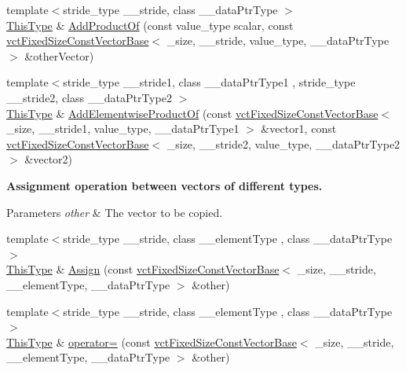 \begin{DoxyCompactItemize}
\item 
{\footnotesize template$<$stride\+\_\+type \+\_\+\+\_\+stride, class \+\_\+\+\_\+data\+Ptr\+Type $>$ }\\\hyperlink{classvct_fixed_size_const_vector_base_a071063bc4fa43112cc287b2dbef53180}{This\+Type} \& \hyperlink{classvct_fixed_size_vector_base_a850445a0bda31f286347257e54b721a3}{Add\+Product\+Of} (const value\+\_\+type scalar, const \hyperlink{classvct_fixed_size_const_vector_base}{vct\+Fixed\+Size\+Const\+Vector\+Base}$<$ \+\_\+size, \+\_\+\+\_\+stride, value\+\_\+type, \+\_\+\+\_\+data\+Ptr\+Type $>$ \&other\+Vector)
\item 
{\footnotesize template$<$stride\+\_\+type \+\_\+\+\_\+stride1, class \+\_\+\+\_\+data\+Ptr\+Type1 , stride\+\_\+type \+\_\+\+\_\+stride2, class \+\_\+\+\_\+data\+Ptr\+Type2 $>$ }\\\hyperlink{classvct_fixed_size_const_vector_base_a071063bc4fa43112cc287b2dbef53180}{This\+Type} \& \hyperlink{classvct_fixed_size_vector_base_a3bf0e468dd8a468889edd1c13a3d3f15}{Add\+Elementwise\+Product\+Of} (const \hyperlink{classvct_fixed_size_const_vector_base}{vct\+Fixed\+Size\+Const\+Vector\+Base}$<$ \+\_\+size, \+\_\+\+\_\+stride1, value\+\_\+type, \+\_\+\+\_\+data\+Ptr\+Type1 $>$ \&vector1, const \hyperlink{classvct_fixed_size_const_vector_base}{vct\+Fixed\+Size\+Const\+Vector\+Base}$<$ \+\_\+size, \+\_\+\+\_\+stride2, value\+\_\+type, \+\_\+\+\_\+data\+Ptr\+Type2 $>$ \&vector2)
\end{DoxyCompactItemize}
\begin{Indent}{\bf Assignment operation between vectors of different types.}\par
{\em 
\begin{DoxyParams}{Parameters}
{\em other} & The vector to be copied. \\
\hline
\end{DoxyParams}
}\begin{DoxyCompactItemize}
\item 
{\footnotesize template$<$stride\+\_\+type \+\_\+\+\_\+stride, class \+\_\+\+\_\+element\+Type , class \+\_\+\+\_\+data\+Ptr\+Type $>$ }\\\hyperlink{classvct_fixed_size_const_vector_base_a071063bc4fa43112cc287b2dbef53180}{This\+Type} \& \hyperlink{classvct_fixed_size_vector_base_a0bfbc67194bcb1aa6b614524df8d1fa1}{Assign} (const \hyperlink{classvct_fixed_size_const_vector_base}{vct\+Fixed\+Size\+Const\+Vector\+Base}$<$ \+\_\+size, \+\_\+\+\_\+stride, \+\_\+\+\_\+element\+Type, \+\_\+\+\_\+data\+Ptr\+Type $>$ \&other)
\item 
{\footnotesize template$<$stride\+\_\+type \+\_\+\+\_\+stride, class \+\_\+\+\_\+element\+Type , class \+\_\+\+\_\+data\+Ptr\+Type $>$ }\\\hyperlink{classvct_fixed_size_const_vector_base_a071063bc4fa43112cc287b2dbef53180}{This\+Type} \& \hyperlink{classvct_fixed_size_vector_base_aedf9b574d02b606439207e358a4d6013}{operator=} (const \hyperlink{classvct_fixed_size_const_vector_base}{vct\+Fixed\+Size\+Const\+Vector\+Base}$<$ \+\_\+size, \+\_\+\+\_\+stride, \+\_\+\+\_\+element\+Type, \+\_\+\+\_\+data\+Ptr\+Type $>$ \&other)
\end{DoxyCompactItemize}
\end{Indent}
